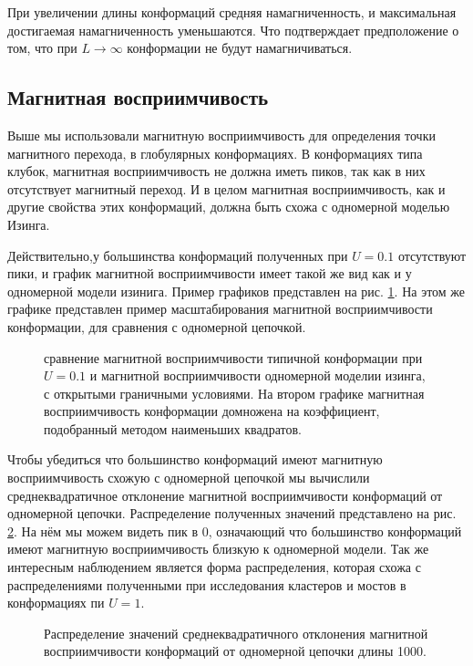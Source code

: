 При увеличении длины конформаций средняя намагниченность, и максимальная достигаемая намагниченность уменьшаются. Что подтверждает предположение о том, что при $L\to \infty$ конформации не будут намагничиваться.


\subsection{Магнитная восприимчивость}
Выше мы использовали магнитную восприимчивость для определения точки магнитного перехода, в глобулярных конформациях. В конформациях типа клубок, магнитная восприимчивость не должна иметь пиков, так как в них отсутствует магнитный переход. И в целом магнитная восприимчивость, как и другие свойства этих конформаций, должна быть схожа с одномерной моделью Изинга.

Действительно,у большинства конформаций полученных при $U=0.1$ отсутствуют пики, и график магнитной восприимчивости имеет такой же вид как и у одномерной модели изинига. Пример графиков представлен на рис. \ref{fig:MS_1D_comparison}. На этом же графике представлен пример масштабирования магнитной восприимчивости конформации, для сравнения с одномерной цепочкой.

\begin{figure}[ht]
	\centering
	
	\caption{сравнение магнитной восприимчивости типичной конформации при $U=0.1$ и магнитной восприимчивости одномерной моделии изинга, с открытыми граничными условиями. На втором графике магнитная восприимчивость конформации домножена на коэффициент, подобранный методом наименьших квадратов.}
	\label{fig:MS_1D_comparison}
\end{figure}


Чтобы убедиться что большинство конформаций имеют магнитную восприимчивость схожую с одномерной цепочкой мы вычислили среднеквадратичное отклонение магнитной восприимчивости конформаций от одномерной цепочки. Распределение полученных значений представлено на рис. \ref{fig:MS_1D_dif_distr}. На нём мы можем видеть пик в 0, означающий что большинство конформаций имеют магнитную восприимчивость близкую к одномерной модели. Так же интересным наблюдением является форма распределения, которая схожа с распределениями полученными при исследования кластеров и мостов в конформациях пи $U=1$.

\begin{figure}[ht]
	\centering
	
	\caption{Распределение значений среднеквадратичного отклонения магнитной восприимчивости конформаций от одномерной цепочки длины 1000.}
	\label{fig:MS_1D_dif_distr}
\end{figure}


